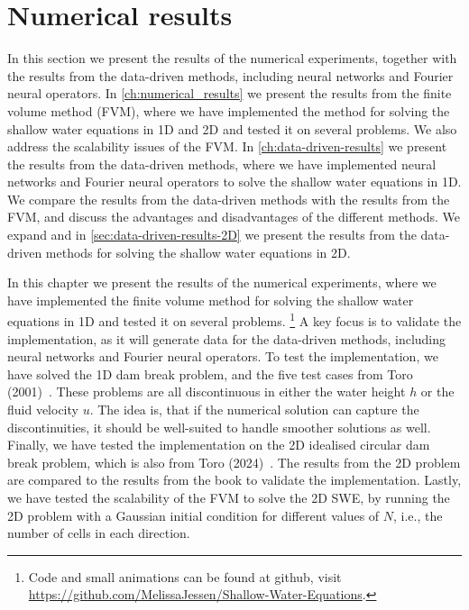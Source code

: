 \chapter{Numerical results}\label{ch:numerical_results}
In this section we present the results of the numerical experiments, together with the results from the data-driven methods, including neural networks and Fourier neural operators.
In \autoref{ch:numerical_results} we present the results from the finite volume method (FVM), where we have implemented the method for solving the shallow water equations in 1D  and 2D and tested it on several problems.
We also address the scalability issues of the FVM.
In \autoref{ch:data-driven-results} we present the results from the data-driven methods, where we have implemented neural networks and Fourier neural operators to solve the shallow water equations in 1D.
We compare the results from the data-driven methods with the results from the FVM, and discuss the advantages and disadvantages of the different methods.
We expand and in \autoref{sec:data-driven-results-2D} we present the results from the data-driven methods for solving the shallow water equations in 2D.

In this chapter we present the results of the numerical experiments, where we have implemented the finite volume method for solving the shallow water equations in 1D and tested it on several problems.
\footnote{Code and small animations can be found at github, visit \url{https://github.com/MelissaJessen/Shallow-Water-Equations}.}
A key focus is to validate the implementation, as it will generate data for the data-driven methods, including neural networks and Fourier neural operators.
To test the implementation, we have solved the 1D dam break problem, and the five test cases from Toro (2001)~\cite{Toro2001-Shock}.
These problems are all discontinuous in either the water height $h$ or the fluid velocity $u$.
The idea is, that if the numerical solution can capture the discontinuities, it should be well-suited to handle smoother solutions as well.
Finally, we have tested the implementation on the 2D idealised circular dam break problem, which is also from Toro (2024)~\cite{Toro2024}.
The results from the 2D problem are compared to the results from the book to validate the implementation.
Lastly, we have tested the scalability of the FVM to solve the 2D SWE, by running the 2D problem with a Gaussian initial condition for different values of $N$, i.e., the number of cells in each direction.

